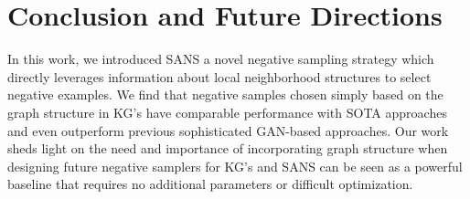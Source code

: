 \section{Conclusion and Future Directions}
\label{sec:conclusion}

In this work, we introduced SANS a novel negative sampling strategy which directly leverages information about local neighborhood structures to select negative examples. We find that negative samples chosen simply based on the graph structure in KG's have comparable performance with SOTA approaches and even outperform previous sophisticated GAN-based approaches. Our work sheds light on the need and importance of incorporating graph structure when designing future negative samplers for KG's and SANS can be seen as a powerful baseline that requires no additional parameters or difficult optimization. 



